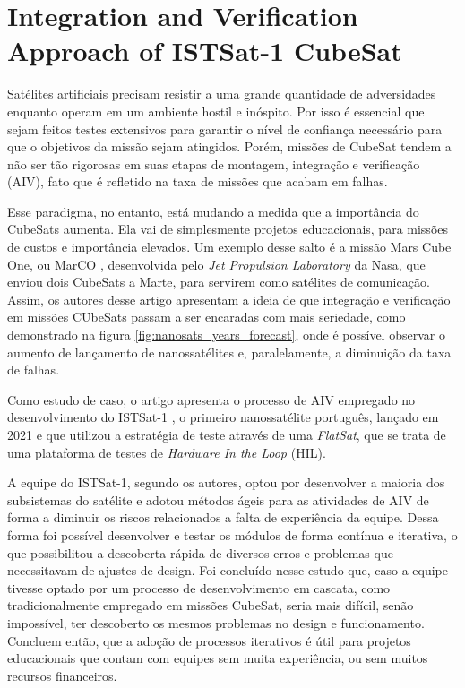 \section{Integration and Verification Approach of ISTSat-1 CubeSat \texorpdfstring{\\ \cite{aiv-cubesat}}{} }
\label{relacionados:aiv-cubesat}
Satélites artificiais precisam resistir a uma grande quantidade de adversidades enquanto operam em um ambiente hostil e inóspito. Por isso é essencial que sejam feitos testes extensivos para garantir o nível de confiança necessário para que o objetivos da missão sejam atingidos. Porém, missões de CubeSat tendem a não ser tão rigorosas em suas etapas de montagem, integração e verificação (AIV), fato que é refletido na taxa de missões que acabam em falhas.

Esse paradigma, no entanto, está mudando a medida que a importância do CubeSats aumenta. Ela vai de simplesmente projetos educacionais, para missões de custos e importância elevados. Um exemplo desse salto é a missão Mars Cube One, ou MarCO \cite{mars-cubesat}, desenvolvida pelo \textit{Jet Propulsion Laboratory} da Nasa, que enviou dois CubeSats a Marte, para servirem como satélites de comunicação. Assim, os autores desse artigo apresentam a ideia de que integração e verificação em missões CUbeSats passam a ser encaradas com mais seriedade, como demonstrado na figura \ref{fig:nanosats_years_forecast}, onde é possível observar o aumento de lançamento de nanossatélites e, paralelamente, a diminuição da taxa de falhas.

Como estudo de caso, o artigo apresenta o processo de AIV empregado no desenvolvimento do ISTSat-1 \cite{istsat-1}, o primeiro nanossatélite português, lançado em 2021 e que utilizou a estratégia de teste através de uma \textit{FlatSat}, que se trata de uma plataforma de testes de \textit{Hardware In the Loop} (HIL).

A equipe do ISTSat-1, segundo os autores, optou por desenvolver a maioria dos subsistemas do satélite e adotou métodos ágeis para as atividades de AIV de forma a diminuir os riscos relacionados a falta de experiência da equipe. Dessa forma foi possível desenvolver e testar os módulos de forma contínua e iterativa, o que possibilitou a descoberta rápida de diversos erros e problemas que necessitavam de ajustes de design. Foi concluído nesse estudo que, caso a equipe tivesse optado por um processo de desenvolvimento em cascata, como tradicionalmente empregado em missões CubeSat, seria mais difícil, senão impossível, ter descoberto os mesmos problemas no design e funcionamento. Concluem então, que a adoção de processos iterativos é útil para projetos educacionais que contam com equipes sem muita experiência, ou sem muitos recursos financeiros.

